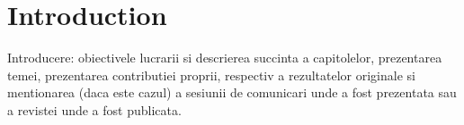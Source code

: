 \chapter{Introduction}

\label{intro}

\par Introducere: obiectivele lucrarii si descrierea succinta a capitolelor, prezentarea temei, prezentarea contributiei proprii, respectiv a rezultatelor originale si mentionarea (daca este cazul) a sesiunii de comunicari unde a fost prezentata sau a revistei unde a fost publicata.
